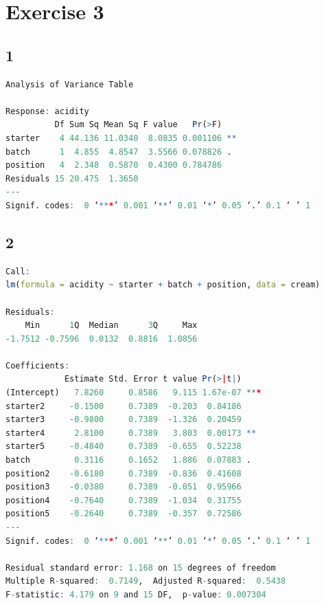 \documentclass{article}
\begin{document}
  \section*{Exercise 3}
    \subsection*{1}
      \begin{lstlisting}[language=R]
Analysis of Variance Table

Response: acidity
          Df Sum Sq Mean Sq F value   Pr(>F)   
starter    4 44.136 11.0340  8.0835 0.001106 **
batch      1  4.855  4.8547  3.5566 0.078826 . 
position   4  2.348  0.5870  0.4300 0.784786   
Residuals 15 20.475  1.3650                    
---
Signif. codes:  0 ‘***’ 0.001 ‘**’ 0.01 ‘*’ 0.05 ‘.’ 0.1 ‘ ’ 1
      \end{lstlisting}
      
    
    \subsection*{2}
      \begin{lstlisting}[language=R]
Call:
lm(formula = acidity ~ starter + batch + position, data = cream)

Residuals:
    Min      1Q  Median      3Q     Max 
-1.7512 -0.7596  0.0132  0.8816  1.0856 

Coefficients:
            Estimate Std. Error t value Pr(>|t|)    
(Intercept)   7.8260     0.8586   9.115 1.67e-07 ***
starter2     -0.1500     0.7389  -0.203  0.84186    
starter3     -0.9800     0.7389  -1.326  0.20459    
starter4      2.8100     0.7389   3.803  0.00173 ** 
starter5     -0.4840     0.7389  -0.655  0.52238    
batch         0.3116     0.1652   1.886  0.07883 .  
position2    -0.6180     0.7389  -0.836  0.41608    
position3    -0.0380     0.7389  -0.051  0.95966    
position4    -0.7640     0.7389  -1.034  0.31755    
position5    -0.2640     0.7389  -0.357  0.72586    
---
Signif. codes:  0 ‘***’ 0.001 ‘**’ 0.01 ‘*’ 0.05 ‘.’ 0.1 ‘ ’ 1

Residual standard error: 1.168 on 15 degrees of freedom
Multiple R-squared:  0.7149,  Adjusted R-squared:  0.5438 
F-statistic: 4.179 on 9 and 15 DF,  p-value: 0.007304
      \end{lstlisting}
      \label{tble:estimates}
\end{document}
